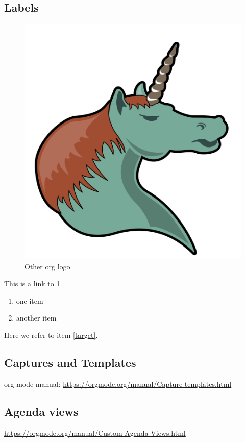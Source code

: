 \documentclass[11pt]{article}
\begin{document}
\subsection{Labels}
\label{sec:orgdd9d3c0}

\begin{figure}[htbp]
\centering
\includegraphics[width=.9\linewidth]{org_logo.png}
\caption{\label{figura_a_org}Other org logo}
\end{figure}

This is a link to \ref{figura_a_org}


\begin{enumerate}
\item one item
\item \label{target}another item
\end{enumerate}
Here we refer to item \ref{target}.




\subsection{Captures and Templates}
\label{sec:orgd9206aa}


org-mode manual: \url{https://orgmode.org/manual/Capture-templates.html}

\subsection{Agenda views}
\label{sec:org432e55b}


\url{https://orgmode.org/manual/Custom-Agenda-Views.html}
\end{document}

